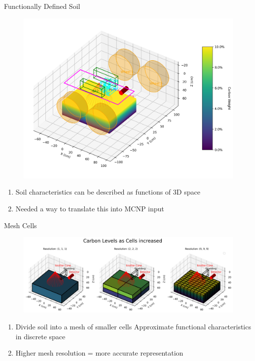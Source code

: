 \documentclass[10pt,hyperref={colorlinks,citecolor=blue,urlcolor=peking_blue,linkcolor=}]{beamer}
\theoremstyle{plain}
\begin{document}
\begin{frame}{Functionally Defined Soil}
\begin{figure}[Carbon as a function in the soil]
\begin{center}
\includegraphics[width=.5\linewidth]{../Figures/FunctionallyDefinedSoil/Carbonasafunctioninthesoil.png}
\end{center}
\end{figure}
\begin{enumerate}
\item Soil characteristics can be described as functions of 3D space
\item Needed a way to translate this into MCNP input
\end{enumerate}
\end{frame}
\begin{frame}{Mesh Cells}
\begin{figure}[Single to many cells]
\begin{center}
\includegraphics[width=1\linewidth]{../Figures/MCNP/SingleToManyCells.png}
\end{center}
\end{figure}
\begin{enumerate}
\item Divide soil into a mesh of smaller cells
Approximate functional characteristics in discrete space
\item Higher mesh resolution = more accurate representation
\end{enumerate}
\end{frame}
\end{document}
